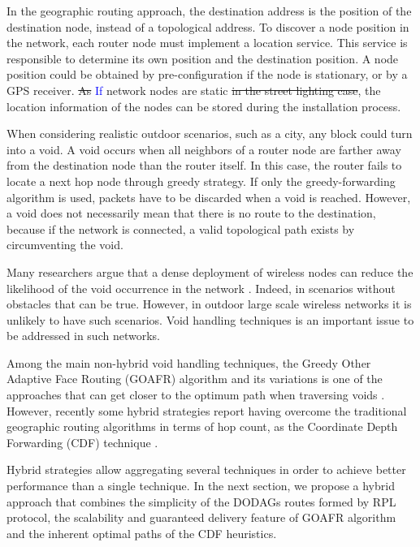 \documentclass[final,authoryear,3p,twocolumn]{elsarticle}
\newcommand{\removed}{\sout}
\newcommand{\rev}{\textcolor{blue}}
\begin{document}
In the geographic routing approach, the destination address is the position of the destination node, instead of a topological address. To discover a node position in the network, each router node must implement a location service. This service is responsible to determine its own position and the destination position. A node position could be obtained by pre-configuration if the node is stationary, or by a GPS receiver. \removed{As} \rev{If} network nodes are static \removed{in the street lighting case}, the location information of the nodes can be stored during the installation process. 

When considering realistic outdoor scenarios, such as a city, any block could turn into a void. A void occurs when all neighbors of a router node are farther away from the destination node than the router itself. In this case, the router fails to locate a next hop node through greedy strategy. If only the greedy-forwarding algorithm is used, packets have to be discarded when a void is reached. However, a void does not necessarily mean that there is no route to the destination, because if the network is connected, a valid topological path exists by circumventing the void. 

Many researchers argue that a dense deployment of wireless nodes can reduce the likelihood of the void occurrence in the network \citep{Position_Based_Routing_Ad_Hoc_2001, WSN_routing, survey_2007}. Indeed, in scenarios without obstacles that can be true. However, in outdoor large scale wireless networks it is unlikely to have such scenarios. Void handling techniques is an important issue to be addressed in such networks. 

Among the main non-hybrid void handling techniques, the Greedy Other Adaptive Face Routing (GOAFR) algorithm and its variations is one of the approaches that can get closer to the optimum path when traversing voids \citep{GOAFR_2008}. However, recently some hybrid strategies report having overcome the traditional geographic routing algorithms in terms of hop count, as the Coordinate Depth Forwarding (CDF) technique \citep{Denardin2011}.

Hybrid strategies allow aggregating several techniques in order to achieve better performance than a single technique. In the next section, we propose a hybrid approach that combines the simplicity of the DODAGs routes formed by RPL protocol, the scalability and guaranteed delivery feature of GOAFR algorithm and the inherent optimal paths of the CDF heuristics.
\end{document}
